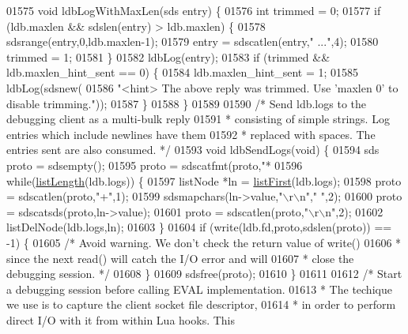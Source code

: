 \begin{DoxyCode}
{{{{{{{{{{{{01575 \textcolor{keywordtype}{void} ldbLogWithMaxLen(sds entry) \{
01576     \textcolor{keywordtype}{int} trimmed = 0;
01577     \textcolor{keywordflow}{if} (ldb.maxlen && sdslen(entry) > ldb.maxlen) \{
01578         sdsrange(entry,0,ldb.maxlen-1);
01579         entry = sdscatlen(entry,\textcolor{stringliteral}{" ..."},4);
01580         trimmed = 1;
01581     \}
01582     ldbLog(entry);
01583     \textcolor{keywordflow}{if} (trimmed && ldb.maxlen\_hint\_sent == 0) \{
01584         ldb.maxlen\_hint\_sent = 1;
01585         ldbLog(sdsnew(
01586         \textcolor{stringliteral}{"<hint> The above reply was trimmed. Use 'maxlen 0' to disable trimming."}));
01587     \}
01588 \}
01589 
01590 \textcolor{comment}{/* Send ldb.logs to the debugging client as a multi-bulk reply}
01591 \textcolor{comment}{ * consisting of simple strings. Log entries which include newlines have them}
01592 \textcolor{comment}{ * replaced with spaces. The entries sent are also consumed. */}
01593 \textcolor{keywordtype}{void} ldbSendLogs(\textcolor{keywordtype}{void}) \{
01594     sds proto = sdsempty();
01595     proto = sdscatfmt(proto,\textcolor{stringliteral}{"*%
01596     \textcolor{keywordflow}{while}(\hyperlink{adlist_8h_afde0ab079f934670e82119b43120e94b}{listLength}(ldb.logs)) \{
01597         listNode *ln = \hyperlink{adlist_8h_aa8dc514bbe217bb2e87c1c77cfa84690}{listFirst}(ldb.logs);
01598         proto = sdscatlen(proto,\textcolor{stringliteral}{"+"},1);
01599         sdsmapchars(ln->value,\textcolor{stringliteral}{"\(\backslash\)r\(\backslash\)n"},\textcolor{stringliteral}{"  "},2);
01600         proto = sdscatsds(proto,ln->value);
01601         proto = sdscatlen(proto,\textcolor{stringliteral}{"\(\backslash\)r\(\backslash\)n"},2);
01602         listDelNode(ldb.logs,ln);
01603     \}
01604     \textcolor{keywordflow}{if} (write(ldb.fd,proto,sdslen(proto)) == -1) \{
01605         \textcolor{comment}{/* Avoid warning. We don't check the return value of write()}
01606 \textcolor{comment}{         * since the next read() will catch the I/O error and will}
01607 \textcolor{comment}{         * close the debugging session. */}
01608     \}
01609     sdsfree(proto);
01610 \}
01611 
01612 \textcolor{comment}{/* Start a debugging session before calling EVAL implementation.}
01613 \textcolor{comment}{ * The techique we use is to capture the client socket file descriptor,}
01614 \textcolor{comment}{ * in order to perform direct I/O with it from within Lua hooks. This}
}}}}}}}}}}}}}
\end{DoxyCode}
